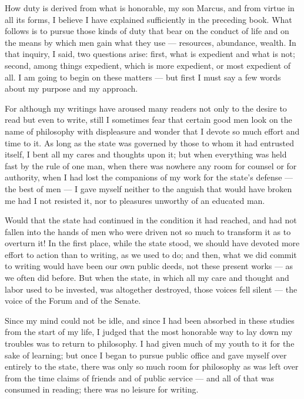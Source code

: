 
 How duty is derived from what is honorable, my son Marcus, and from virtue in all its forms, I believe I have explained sufficiently in the preceding book. What follows is to pursue those kinds of duty that bear on the conduct of life and on the means by which men gain what they use — resources, abundance, wealth. In that inquiry, I said, two questions arise: first, what is expedient and what is not; second, among things expedient, which is more expedient, or most expedient of all. I am going to begin on these matters — but first I must say a few words about my purpose and my approach.

 For although my writings have aroused many readers not only to the desire to read but even to write, still I sometimes fear that certain good men look on the name of philosophy with displeasure and wonder that I devote so much effort and time to it. As long as the state was governed by those to whom it had entrusted itself, I bent all my cares and thoughts upon it; but when everything was held fast by the rule of one man, when there was nowhere any room for counsel or for authority, when I had lost the companions of my work for the state's defense — the best of men — I gave myself neither to the anguish that would have broken me had I not resisted it, nor to pleasures unworthy of an educated man.

 Would that the state had continued in the condition it had reached, and had not fallen into the hands of men who were driven not so much to transform it as to overturn it! In the first place, while the state stood, we should have devoted more effort to action than to writing, as we used to do; and then, what we did commit to writing would have been our own public deeds, not these present works — as we often did before. But when the state, in which all my care and thought and labor used to be invested, was altogether destroyed, those voices fell silent — the voice of the Forum and of the Senate.

 Since my mind could not be idle, and since I had been absorbed in these studies from the start of my life, I judged that the most honorable way to lay down my troubles was to return to philosophy. I had given much of my youth to it for the sake of learning; but once I began to pursue public office and gave myself over entirely to the state, there was only so much room for philosophy as was left over from the time claims of friends and of public service — and all of that was consumed in reading; there was no leisure for writing.

